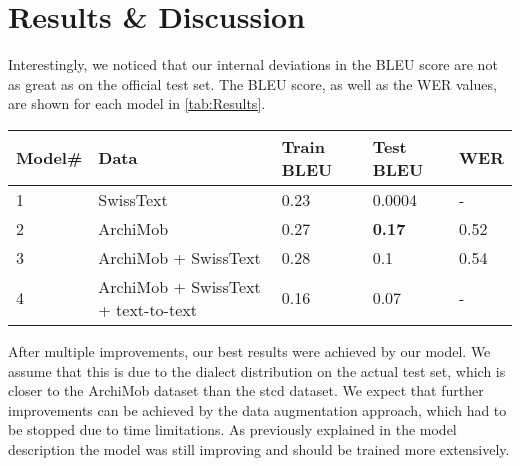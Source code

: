 \section{Results \& Discussion}
Interestingly, we noticed that our internal deviations in the BLEU score are not as great as on the official test set. The BLEU score, as well as the WER values, are shown for each model in
\cref{tab:Results}.

\begin{table*}[!t]
    \centering
    \begin{tabular}{lllll}
    \hline\textbf{Model\#}    & \textbf{Data} & \textbf{Train BLEU}   & \textbf{Test BLEU}  & \textbf{WER}  \\\hline
    1                   & SwissText     & 0.23                  &  0.0004 & -              \\
    2                   & ArchiMob      & 0.27                  & \textbf{0.17}             & 0.52             \\
    3                   & ArchiMob + SwissText      & 0.28                  & 0.1                      & 0.54               \\
    4                   & ArchiMob + SwissText + text-to-text      & 0.16                  & 0.07                      & -              \\
    \hline
    \end{tabular}
    \caption{Results}
    \label{tab:Results}
\end{table*}
After multiple improvements, our best results were achieved by our  model. We assume that this is due to the dialect distribution on the actual test set, which is closer to the ArchiMob dataset
than the \gls{stcd} dataset. We expect that further improvements can be achieved by the data augmentation approach, which had to be stopped due to time limitations. As previously explained in the
model description the  model was still improving and should be trained more extensively.
